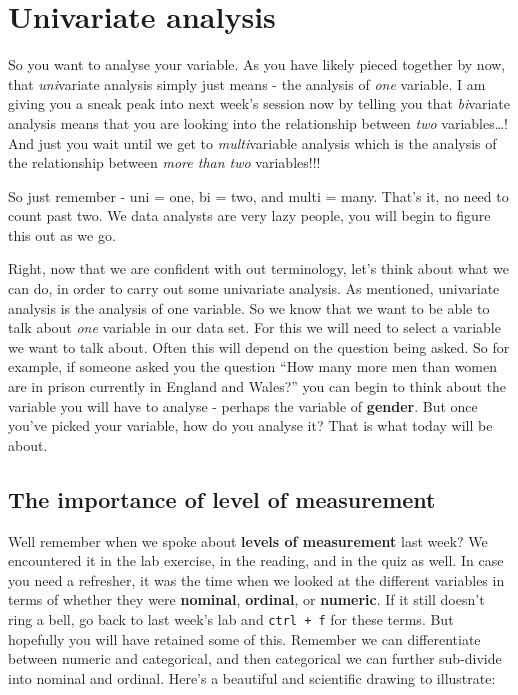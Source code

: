 \documentclass[
]{book}
\begin{document}
\hypertarget{univariate-analysis}{%
\section{Univariate analysis}\label{univariate-analysis}}

So you want to analyse your variable. As you have likely pieced together by now, that \emph{uni}variate analysis simply just means - the analysis of \emph{one} variable. I am giving you a sneak peak into next week's session now by telling you that \emph{bi}variate analysis means that you are looking into the relationship between \emph{two} variables\ldots! And just you wait until we get to \emph{multi}variable analysis which is the analysis of the relationship between \emph{more than two} variables!!!

So just remember - uni = one, bi = two, and multi = many. That's it, no need to count past two. We data analysts are very lazy people, you will begin to figure this out as we go.

Right, now that we are confident with out terminology, let's think about what we can do, in order to carry out some univariate analysis. As mentioned, univariate analysis is the analysis of one variable. So we know that we want to be able to talk about \emph{one} variable in our data set. For this we will need to select a variable we want to talk about. Often this will depend on the question being asked. So for example, if someone asked you the question ``How many more men than women are in prison currently in England and Wales?'' you can begin to think about the variable you will have to analyse - perhaps the variable of \textbf{gender}. But once you've picked your variable, how do you analyse it? That is what today will be about.

\hypertarget{the-importance-of-level-of-measurement}{%
\subsection{The importance of level of measurement}\label{the-importance-of-level-of-measurement}}

Well remember when we spoke about \textbf{levels of measurement} last week? We encountered it in the lab exercise, in the reading, and in the quiz as well. In case you need a refresher, it was the time when we looked at the different variables in terms of whether they were \textbf{nominal}, \textbf{ordinal}, or \textbf{numeric}. If it still doesn't ring a bell, go back to last week's lab and \texttt{ctrl\ +\ f} for these terms. But hopefully you will have retained some of this. Remember we can differentiate between numeric and categorical, and then categorical we can further sub-divide into nominal and ordinal. Here's a beautiful and scientific drawing to illustrate:
\end{document}
